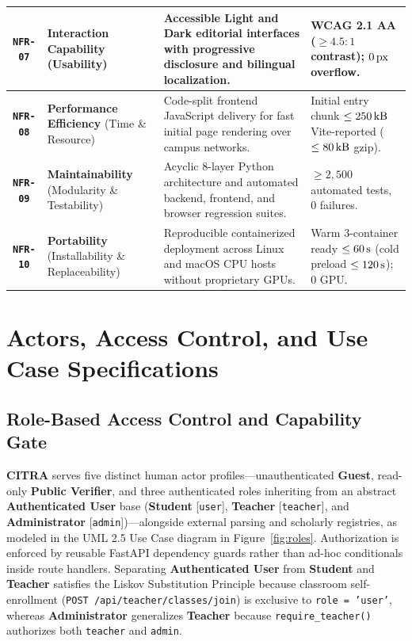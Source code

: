 {\begin{longtable}{|C{0.11}|L{0.25}|L{0.40}|L{0.24}|}
\hline
\textbf{\texttt{NFR-07}} & \textbf{Interaction Capability} (Usability) & Accessible Light and Dark editorial interfaces with progressive disclosure and bilingual localization. & \textbf{WCAG 2.1 AA} ($\ge 4.5:1$ contrast); $0\text{\,px}$ overflow. \\
\hline
\textbf{\texttt{NFR-08}} & \textbf{Performance Efficiency} (Time \& Resource) & Code-split frontend JavaScript delivery for fast initial page rendering over campus networks. & Initial entry chunk \textbf{$\le 250\text{\,kB}$} Vite-reported ($\le 80\text{\,kB}$ gzip). \\
\hline
\textbf{\texttt{NFR-09}} & \textbf{Maintainability} (Modularity \& Testability) & Acyclic 8-layer Python architecture and automated backend, frontend, and browser regression suites. & \textbf{$\ge 2{,}500$} automated tests, $0$ failures. \\
\hline
\textbf{\texttt{NFR-10}} & \textbf{Portability} (Installability \& Replaceability) & Reproducible containerized deployment across Linux and macOS CPU hosts without proprietary GPUs. & Warm 3-container ready \textbf{$\le 60\text{\,s}$} (cold preload \textbf{$\le 120\text{\,s}$}); $0$ GPU. \\
\hline
\end{longtable}
}

\section{Actors, Access Control, and Use Case Specifications}

\subsection{Role-Based Access Control and Capability Gate}

\textbf{CITRA} serves five distinct human actor profiles---unauthenticated \textbf{Guest}, read-only \textbf{Public Verifier}, and three authenticated roles inheriting from an abstract \textbf{Authenticated User} base (\textbf{Student} [\texttt{user}], \textbf{Teacher} [\texttt{teacher}], and \textbf{Administrator} [\texttt{admin}])---alongside external parsing and scholarly registries, as modeled in the UML 2.5 Use Case diagram in Figure~\ref{fig:roles}. Authorization is enforced by reusable FastAPI dependency guards rather than ad-hoc conditionals inside route handlers. Separating \textbf{Authenticated User} from \textbf{Student} and \textbf{Teacher} satisfies the Liskov Substitution Principle because classroom self-enrollment (\texttt{POST /api/teacher/classes/join}) is exclusive to \texttt{role = 'user'}, whereas \textbf{Administrator} generalizes \textbf{Teacher} because \texttt{require\_teacher()} authorizes both \texttt{teacher} and \texttt{admin}.

